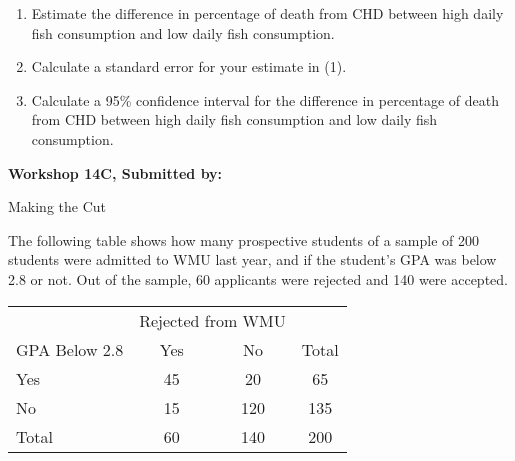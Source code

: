 \documentclass[11pt]{book}\usepackage[]{graphicx}\usepackage[]{color}
\begin{document}
\begin{exercises}
\begin{exercise}
\begin{enumerate}
  \item Estimate the difference in percentage of death from CHD between high daily fish consumption and low daily fish consumption.
  \item Calculate a standard error for your estimate in (1).
  \item Calculate a 95\% confidence interval for the difference in percentage of death from CHD between high daily fish consumption and low daily fish consumption.
\end{enumerate}


\end{exercise}
\begin{solution}  %

\end{solution}

\clearpage

    \begin{exercise}  %

    \begin{center}
\begin{flushleft}\textbf{\large \hfill Workshop 14C, Submitted by: }\end{flushleft}

\end{center}

Making the Cut

The following table shows how many prospective students of a sample of 200 students were admitted to WMU last year, and if the student's GPA was below 2.8 or not.  Out of the sample, 60 applicants were rejected and 140 were accepted.

\begin{center}
\begin{tabular}{@{} lccc @{}} \hline
 	& \multicolumn{2}{c}{Rejected from WMU} \\
GPA Below 2.8 &	Yes &	No & Total \\ \hline
Yes	& 45 &	20 &	65 \\
No &	15 &	120 &	135 \\ \hline
Total &	60 &	140 &	200 \\ \hline
\end{tabular}
\end{center}


\end{exercise}
\end{exercises}
\end{document}

